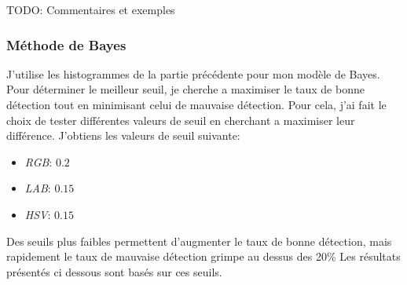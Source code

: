 \documentclass{article}
\begin{document}
TODO: Commentaires et exemples

\subsubsection{Méthode de Bayes}
J'utilise les histogrammes de la partie précédente pour mon modèle de Bayes. Pour déterminer le meilleur seuil, je cherche a maximiser le taux de bonne détection tout en minimisant celui de mauvaise détection. Pour cela, j'ai fait le choix de tester différentes valeurs de seuil en cherchant a maximiser leur différence. J'obtiens les valeurs de seuil suivante:
\begin{itemize}
    \item \textit{RGB}: $0.2$
    \item \textit{LAB}: $0.15$
    \item \textit{HSV}: $0.15$
\end{itemize}
Des seuils plus faibles permettent d'augmenter le taux de bonne détection, mais rapidement le taux de mauvaise détection grimpe au dessus des 20\%
Les résultats présentés ci dessous sont basés sur ces seuils.

\begin{table}[h!]
\centering
{}
\caption{Résultats avec la méthode de Bayes (RGB, seuil 0.2)}
\label{bayes-rgb}
\end{table}


\begin{table}[h!]
\centering
{}
\caption{Résultats avec la méthode de Bayes (LAB, seuil 0.15)}
\label{bayes-lab}
\end{table}
\end{document}
